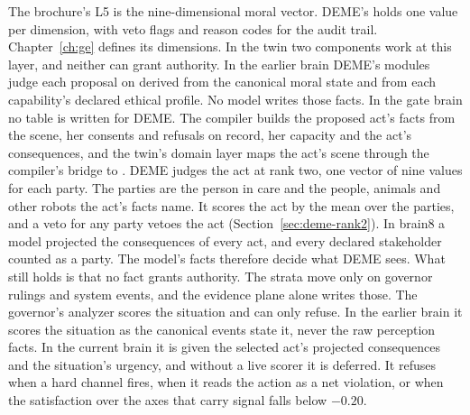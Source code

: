 The brochure's L5 is the nine-dimensional moral vector.
DEME's  holds one value per dimension, with veto flags and reason codes for the
audit trail. Chapter~\ref{ch:ge} defines its dimensions.
In the twin two components work at this layer, and neither can grant authority. In the earlier
brain DEME's modules judge each proposal on  derived from the canonical moral
state and from each capability's declared ethical profile. No model writes those facts.
In the gate brain no table is written for DEME. The compiler builds the proposed act's facts from
the scene, her consents and refusals on record, her capacity and the act's consequences, and the
twin's domain layer maps the act's scene through the compiler's bridge to . DEME
judges the act at rank two, one vector of nine values for each party. The parties are the person in
care and the people, animals and other robots the act's facts name. It scores the act by the mean
over the parties, and a veto for any party vetoes the act (Section~\ref{sec:deme-rank2}). In brain8
a model projected the consequences of every act, and every declared stakeholder counted as a party.
The model's facts therefore decide what DEME sees. What
still holds is that no fact grants authority. The strata move only on governor rulings and system
events, and the evidence plane alone writes those.
The governor's analyzer scores the situation and can only refuse. In the earlier brain it scores
the situation as the canonical events state it, never the raw perception facts. In the current
brain it is given the selected act's projected consequences and the situation's urgency, and
without a live scorer it is deferred. It refuses when a hard channel fires, when it reads the
action as a net violation, or when the satisfaction over the axes that carry signal falls below
$-0.20$.

